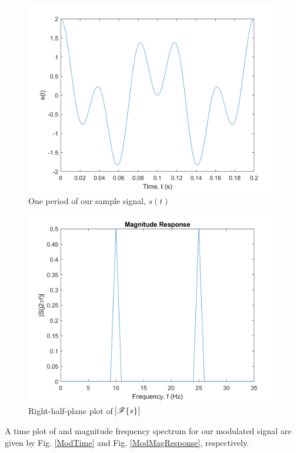 \documentclass[journal]{IEEEtran}
\begin{document}
\begin{figure}[ht]
	\centering
    \includegraphics[width=\columnwidth]{SampleTime.png}
    \caption{One period of our sample signal, $s(t)$}
    \label{SampleTime}
\end{figure}

\begin{figure}[ht]
	\centering
    \includegraphics[width=\columnwidth]{SampleMagResponse.png}
    \caption{Right-half-plane plot of $\abs{\mathscr{F}\{s\}}$}   
    \label{SampleMagResponse}
\end{figure}

A time plot of and magnitude frequency spectrum for our modulated signal are given by Fig. \ref{ModTime} and Fig. \ref{ModMagResponse}, respectively.
\end{document}

